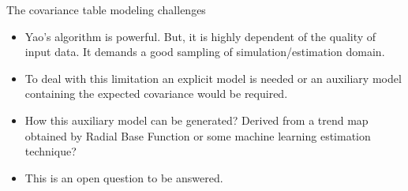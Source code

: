 \begin{frame}{The covariance table modeling challenges}

\begin{itemize}
\item Yao's algorithm is powerful. But, it is highly dependent of the quality of input data. It demands a good sampling of simulation/estimation domain.

\item To deal with this limitation an explicit model is needed or an auxiliary  model containing the expected covariance would be required.

\item How this auxiliary model can be generated? Derived from a trend map obtained by Radial Base Function or some machine learning estimation technique?

\item This is an open question to be answered.
\end{itemize}

\end{frame}


